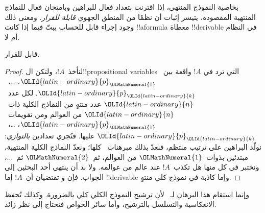 \documentclass[../../../include/open-logic-section]{subfiles}
\begin{document}

بخاصية النموذج المنتهي، إذا اقترنت بتعداد فعال للبراهين وبامتحان فعال
للنماذج المنتهية المقصودة، يتيسر إثبات أن نظمًا من المنطق الجهوي
\emph{قابلة للقرار}. ومعنى ذلك وجود إجراء قابل للحساب يبتّ فيما إذا
كانت !!a{formula} معطاة !!{derivable} في النظام أم لا.

\begin{thm}
   قابل للقرار.
\end{thm}

\begin{proof}
  لنأخذ~$!A$، ولتكن ال!!{propositional variable}s التي ترد في
  $!A$ واقعة بين~$\OLId{latin-ordinary}{p}_\OLMathNumeral{1}$، \dots،~$\OLId{latin-ordinary}{p}_\OLId{latin-ordinary}{k}$. لكل عدد~$\OLId{latin-ordinary}{n}$ عدد منتهٍ من
  النماذج الكلية ذات~$\OLId{latin-ordinary}{n}$ من العوالم ومن تقويمات~$\OLId{latin-ordinary}{p}_\OLMathNumeral{1}$،
  \dots،~$\OLId{latin-ordinary}{p}_\OLId{latin-ordinary}{k}$ عليها. فنُجري تعدادين \emph{بالتوازي}: نولّد البراهين
  على ترتيب منتظم، فنعدّ بذلك مبرهنات~ كلها؛ ونعدّ النماذج
  الكلية المنتهية، مبتدئين بذوات~$\OLMathNumeral{1}$ من العوالم، ثم~$\OLMathNumeral{2}$ ثم~$\dots$،
  ونختبر في كل منها هل تكذب~$!A$ عند عالم من عوالمه.
  ولا بد أن ينتهي أحد البحثين إلى الجواب. فإن
   و
  تقتضيان أن~$!A$ إما !!{derivable} وإما كاذبة في نموذج كلي منتهٍ.
\end{proof}

وإنما استقام هذا البرهان لـ~ لأن ترشيح النموذج الكلي كلي
بالضرورة. وكذلك تُحفظ الانعكاسية والتسلسل بالترشيح، وأما سائر الخواص
فتحتاج إلى نظر زائد.
\end{document}

